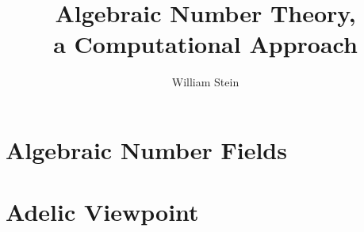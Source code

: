 \documentclass[11pt]{book}
\title{\Huge\bf\sc Algebraic Number Theory,\\a Computational Approach}
\author{William Stein}
\begin{document}
\maketitle
\newpage
\tableofcontents
\newpage




\part{Algebraic Number Fields}



%











\part{Adelic Viewpoint}














\label{page:end}

\newcommand{\nn}[1]{{\bf #1}}
\end{document}
